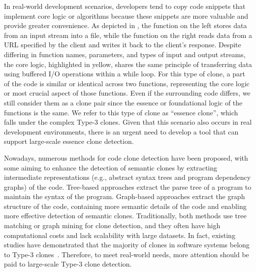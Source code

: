 In real-world development scenarios, developers tend to copy code snippets that implement core logic or algorithms because these snippets are more valuable and provide greater convenience. 
As depicted in , the function on the left stores data from an input stream into a file, while the function on the right reads data from a URL specified by the client and writes it back to the client's response. Despite differing in function names, parameters, and types of input and output streams, the core logic, highlighted in yellow, shares the same principle of transferring data using buffered I/O operations within a while loop. 
For this type of clone, a part of the code is similar or identical across two functions, representing the core logic or most crucial aspect of those functions. 
Even if the surrounding code differs, we still consider them as a clone pair since the essence or foundational logic of the functions is the same. 
We refer to this type of clone as ``essence clone'', which falls under the complex Type-3 clones. 
Given that this scenario also occurs in real development environments, there is an urgent need to develop a tool that can support large-scale essence clone detection.


Nowadays, numerous methods for code clone detection have been proposed, with some aiming to enhance the detection of semantic clones by extracting intermediate representations (e.g., abstract syntax trees and program dependency graphs) of the code.
Tree-based approaches \cite{jiang2007deckard, wei2017cdlh, zhang2019astnn, liang2021astpath, jo2021twopass} extract the parse tree of a program to maintain the syntax of the program.
Graph-based approaches \cite{krinke2001duplix, komondoor2001pdgdup, wang2017ccsharp, zhao2018deepsim, zou2020ccgraph} extract the graph structure of the code, containing more semantic details of the code and enabling more effective detection of semantic clones.
Traditionally, both methods use tree matching or graph mining for clone detection, and they often have high computational costs and lack scalability with large datasets.
In fact, existing studies have demonstrated that the majority of clones in software systems belong to Type-3 clones~\cite{roycordy2010,svajlenko2014big}. 
Therefore, to meet real-world needs, more attention should be paid to large-scale Type-3 clone detection.

